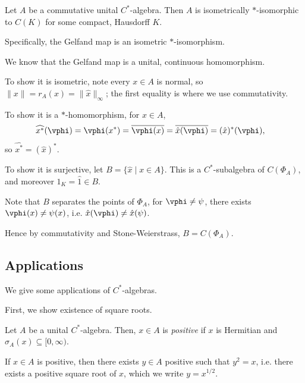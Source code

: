 \documentclass[12pt]{article}
\begin{document}
\begin{theorem}
	Let $A$ be a commutative unital $C^{\ast}$-algebra. Then $A$ is isometrically $\ast$-isomorphic to $C(K)$ for some compact, Hausdorff $K$.

	Specifically, the Gelfand map is an isometric $\ast$-isomorphism.
\end{theorem}

\begin{proofbox}
	We know that the Gelfand map is a unital, continuous homomorphism.

	To show it is isometric, note every $x \in A$ is normal, so $\|x\| = r_A(x) = \|\hat x\|_\infty$; the first equality is where we use commutativity.

	To show it is a $\ast$-homomorphism, for $x \in A$,
	\begin{align*}
		\widehat{x^{\ast}}(\vphi) &= \vphi(x^{\ast}) = \overline{\vphi(x)} = \overline{\hat x(\vphi)} = (\hat x)^{\ast} (\vphi),
	\end{align*}
	so $\widehat{x^{\ast}} = (\hat x)^{\ast}$.

	To show it is surjective, let $B = \{\hat x \mid x \in A\}$. This is a $C^{\ast}$-subalgebra of $C(\Phi_A)$, and moreover $1_K=  \hat 1 \in B$.

	Note that $B$ separates the points of $\Phi_A$, for $\vphi \neq \psi$, there exists $\vphi(x) \neq \psi(x)$, i.e. $\hat x(\vphi) \neq \hat x(\psi)$.

	Hence by commutativity and Stone-Weierstrass, $B = C(\Phi_A)$.
\end{proofbox}


\subsection{Applications}%
\label{sub:caps}

We give some applications of $C^{\ast}$-algebras.

First, we show existence of square roots.

\begin{definition}
	Let $A$ be a unital $C^{\ast}$-algebra. Then, $x \in A$ is \emph{positive} if $x$ is Hermitian and $\sigma_A(x) \subseteq [0, \infty)$.
\end{definition}

\begin{proposition}
	If $x \in A$ is positive, then there exists $y \in A$ positive such that $y^2 = x$, i.e. there exists a positive square root of $x$, which we write $y = x^{1/2}$.
\end{proposition}
\end{document}
